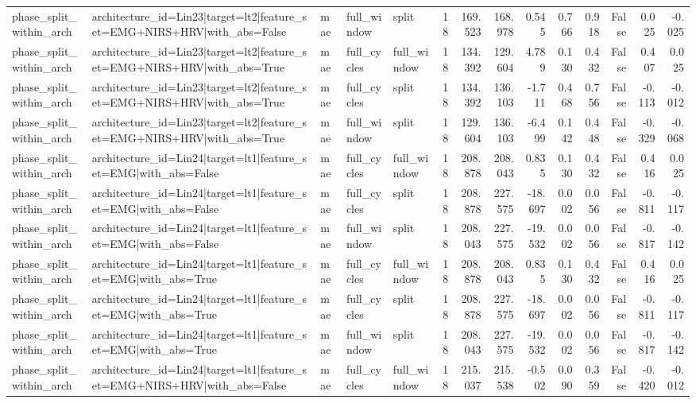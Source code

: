 \begin{table}
\begin{tabular}{lllllrrrrrrrrr}
phase_split_within_arch & architecture_id=Lin23|target=lt2|feature_set=EMG+NIRS+HRV|with_abs=False & mae & full_window & split & 18 & 169.523 & 168.978 & 0.545 & 0.766 & 0.918 & False & 0.025 & -0.025 \\
phase_split_within_arch & architecture_id=Lin23|target=lt2|feature_set=EMG+NIRS+HRV|with_abs=True & mae & full_cycles & full_window & 18 & 134.392 & 129.604 & 4.789 & 0.130 & 0.432 & False & 0.407 & 0.025 \\
phase_split_within_arch & architecture_id=Lin23|target=lt2|feature_set=EMG+NIRS+HRV|with_abs=True & mae & full_cycles & split & 18 & 134.392 & 136.103 & -1.711 & 0.468 & 0.756 & False & -0.113 & -0.012 \\
phase_split_within_arch & architecture_id=Lin23|target=lt2|feature_set=EMG+NIRS+HRV|with_abs=True & mae & full_window & split & 18 & 129.604 & 136.103 & -6.499 & 0.142 & 0.448 & False & -0.329 & -0.068 \\
phase_split_within_arch & architecture_id=Lin24|target=lt1|feature_set=EMG|with_abs=False & mae & full_cycles & full_window & 18 & 208.878 & 208.043 & 0.835 & 0.130 & 0.432 & False & 0.416 & 0.025 \\
phase_split_within_arch & architecture_id=Lin24|target=lt1|feature_set=EMG|with_abs=False & mae & full_cycles & split & 18 & 208.878 & 227.575 & -18.697 & 0.002 & 0.056 & False & -0.811 & -0.117 \\
phase_split_within_arch & architecture_id=Lin24|target=lt1|feature_set=EMG|with_abs=False & mae & full_window & split & 18 & 208.043 & 227.575 & -19.532 & 0.002 & 0.056 & False & -0.817 & -0.142 \\
phase_split_within_arch & architecture_id=Lin24|target=lt1|feature_set=EMG|with_abs=True & mae & full_cycles & full_window & 18 & 208.878 & 208.043 & 0.835 & 0.130 & 0.432 & False & 0.416 & 0.025 \\
phase_split_within_arch & architecture_id=Lin24|target=lt1|feature_set=EMG|with_abs=True & mae & full_cycles & split & 18 & 208.878 & 227.575 & -18.697 & 0.002 & 0.056 & False & -0.811 & -0.117 \\
phase_split_within_arch & architecture_id=Lin24|target=lt1|feature_set=EMG|with_abs=True & mae & full_window & split & 18 & 208.043 & 227.575 & -19.532 & 0.002 & 0.056 & False & -0.817 & -0.142 \\
phase_split_within_arch & architecture_id=Lin24|target=lt1|feature_set=EMG+NIRS+HRV|with_abs=False & mae & full_cycles & full_window & 18 & 215.037 & 215.538 & -0.502 & 0.090 & 0.359 & False & -0.420 & -0.012 \\

\end{tabular}
\end{table}
